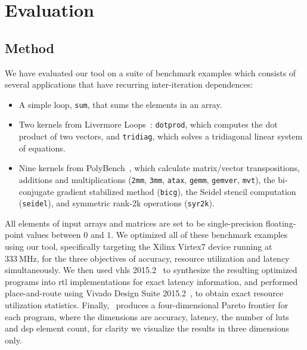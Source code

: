 \section{Evaluation}
\label{lo:sec:results}

\newcommand\redcircle{%
\begin{tikzpicture}\draw[red] (0,0) circle (1mm);\end{tikzpicture}}


\subsection{Method}
\label{lo:sub:method}

We have evaluated our tool on a suite of benchmark examples which consists of
several applications that have recurring inter-iteration dependences:
\begin{itemize}

\item A simple loop, \verb|sum|, that sums the elements in an array.

\item Two kernels from Livermore Loops~\cite{livermore}: \verb|dotprod|, which
computes the dot product of two vectors, and \verb|tridiag|, which solves a
tridiagonal linear system of equations.

\item Nine kernels from PolyBench~\cite{polybench}, which calculate
matrix/vector transpositions, additions and multiplications (\verb|2mm|,
\verb|3mm|, \verb|atax|, \verb|gemm|, \verb|gemver|, \verb|mvt|), the
bi-conjugate gradient stabilized method (\verb|bicg|), the Seidel stencil
computation (\verb|seidel|), and symmetric rank-2k operations
(\verb|syr2k|).

\end{itemize}

All elements of input arrays and matrices are set to be single-precision
floating-point values between $0$ and $1$.  We optimized all of these
benchmark examples using our tool, specifically targeting the Xilinx Virtex7
device running at $333~\mathrm{MHz}$, for the three objectives of accuracy,
resource utilization and latency simultaneously.  We then used \gls{vhls}
2015.2~\cite{vivado_hls} to synthesize the resulting optimized programs
into \gls{rtl} implementations for exact latency information, and performed
place-and-route using Vivado Design Suite 2015.2~\cite{vivado_ds}, to
obtain exact resource utilization statistics.  Finally, \soap~produces a
four-dimensional Pareto frontier for each program, where the dimensions are
accuracy, latency, the number of \glspl{lut} and \gls{dsp} element count, for
clarity we visualize the results in three dimensions only.

